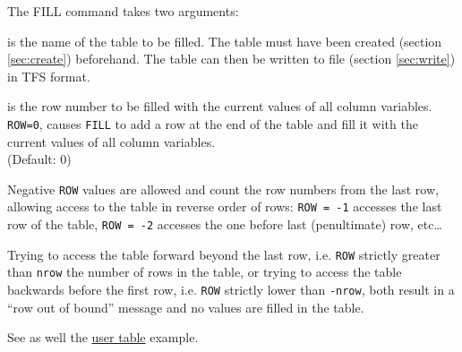 The FILL command takes two arguments:
\begin{madlist}
   is the name of the table to be filled. The table must
  have been created (section \ref{sec:create}) beforehand. 
  The table can then be written to file (section \ref{sec:write}) in TFS
  format. 

   is the row number to be filled with the current values of
  all column variables. \texttt{ROW=0}, causes \texttt{FILL} to add a row at
  the end of the table and fill it with the current values of all
  column variables. \\ (Default: 0) 
\end{madlist}

Negative \texttt{ROW} values are allowed and count the row numbers from
the last row, allowing access to the table in reverse order of rows:
\texttt{ROW~=~-1} accesses the last row of the table,
\texttt{ROW~=~-2} accesses the one before last (penultimate) row,
etc\ldots  


Trying to access the table forward beyond the last row, i.e. \texttt{ROW}
strictly greater than {\tt nrow} the number of rows in the table, or
trying to access the table backwards before the first row, i.e. \texttt{ROW}
strictly lower than {\tt -nrow}, both result in a ``row out of bound''
message and no values are filled in the table.


See as well the \href{../Introduction/select.html#ucreate}{user table}
example.   





